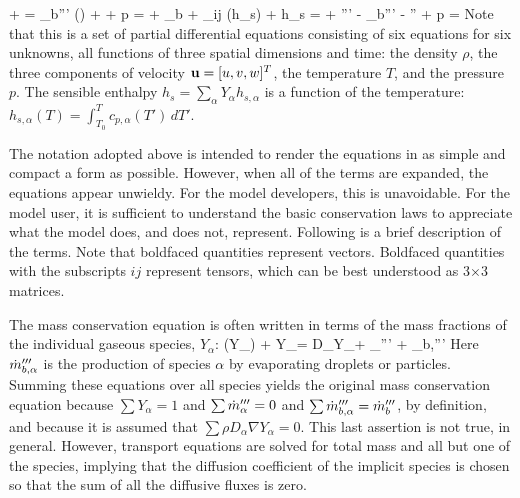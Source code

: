 \documentclass[11pt]{book}
\begin{document}
\vspace{\baselineskip}
\be {} + \nabla \cdot \rho \bu  =  \dm_b'''  \label{mass} \ee
{}
\be {} (\rho \bu) + \nabla \cdot \rho \bu \bu
+ \nabla p = \rho \bg + \bof_b
+ \nabla \cdot \btau_{ij}   \label{momentum} \ee
{}
\be {}(\rho h_s) + \nabla \cdot \rho h_s \bu =   + \dq''' - \dq_b'''
        - \nabla \cdot \dbq'' + \epsilon \label{energy} \ee
{}
\be p =   \label{basicstate} \ee
Note that this is a set of partial differential equations consisting of
six equations for six unknowns, all functions of three spatial dimensions and time:
the density $\rho$, the three components
of velocity ${\bf u}=[u,v,w]^T$, the temperature $T$, and the pressure $p$.
The sensible enthalpy $h_s = \sum_\alpha Y_\alpha h_{s,\alpha}$ is a function of the temperature: $h_{s,\alpha}(T)=\int_{T_0}^T c_{p,\alpha}(T') \, dT'$.

The notation adopted above is intended to render the equations in as
simple and compact a form as possible. However, when all of the terms are expanded, the
equations appear unwieldy. For the model developers, this is unavoidable. For the model
user, it is sufficient to understand the basic conservation laws to appreciate what the
model does, and does not, represent. Following is a brief description of the
terms. Note that boldfaced quantities represent vectors. Boldfaced quantities with the subscripts $ij$
represent tensors, which can be best understood as 3$\times$3 matrices.

The mass conservation equation is often written in terms of the mass fractions of the individual gaseous species, $Y_\alpha$:
\be {}(\rho Y_\alpha) + \nabla \cdot \rho Y_\alpha \bu = \nabla \cdot \rho D_\alpha \nabla Y_\alpha + \dm_\alpha''' + \dm_{b,\alpha}'''
\label{species}
\ee
Here $\dot{m}_{b,\alpha}'''$ is the production of species $\alpha$ by evaporating droplets or particles.
Summing these equations over all species yields the original mass conservation equation because
$\sum Y_\alpha=1$ and $\sum \dot{m}_\alpha''' = 0$ and $\sum
\dot{m}_{b,\alpha}'''=\dot{m}_b'''$, by definition, and because it is assumed
that $\sum \rho D_\alpha \nabla Y_\alpha = 0$. This last assertion is not true, in general. However, transport equations are solved for total
mass and all but one of the species, implying that the diffusion coefficient of the implicit species is chosen so that the sum of all the
diffusive fluxes is zero.
\end{document}

